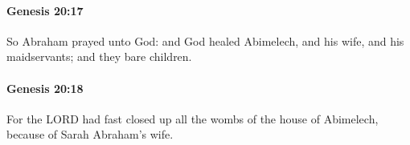 		\paragraph{Genesis 20:17} %
			\label{GENESIS-20-17}

			So Abraham prayed unto God: and God healed Abimelech, and his wife, and his maidservants; and they bare children.


		\paragraph{Genesis 20:18} %
			\label{GENESIS-20-18}

			For the LORD had fast closed up all the wombs of the house of Abimelech, because of Sarah Abraham's wife.

